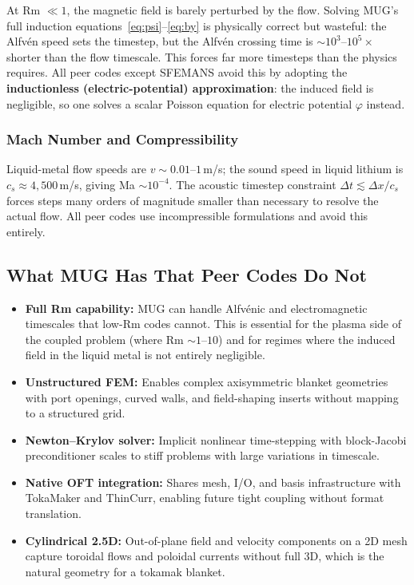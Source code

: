 \documentclass[11pt,letterpaper]{article}
\begin{document}
At Rm $\ll 1$, the magnetic field is barely perturbed by the flow.  Solving
MUG's full induction equations~\eqref{eq:psi}--\eqref{eq:by} is physically
correct but wasteful: the Alfv\'{e}n speed sets the timestep, but the
Alfv\'{e}n crossing time is $\sim 10^3$--$10^5\times$ shorter than the
flow timescale.  This forces far more timesteps than the physics requires.
All peer codes except SFEMANS avoid this by adopting the \textbf{inductionless
(electric-potential) approximation}: the induced field is negligible, so one
solves a scalar Poisson equation for electric potential $\varphi$ instead.

\subsubsection{Mach Number and Compressibility}

Liquid-metal flow speeds are $v \sim 0.01$--$1$\,m/s; the sound speed in
liquid lithium is $c_s \approx 4{,}500$\,m/s, giving Ma $\sim 10^{-4}$.  The
acoustic timestep constraint $\Delta t \lesssim \Delta x / c_s$ forces steps
many orders of magnitude smaller than necessary to resolve the actual flow.
All peer codes use incompressible formulations and avoid this entirely.

\subsection{What MUG Has That Peer Codes Do Not}

\begin{itemize}
  \item \textbf{Full Rm capability:} MUG can handle Alfv\'{e}nic and
    electromagnetic timescales that low-Rm codes cannot.  This is essential
    for the plasma side of the coupled problem (where Rm $\sim 1$--$10$) and
    for regimes where the induced field in the liquid metal is not entirely
    negligible.

  \item \textbf{Unstructured FEM:} Enables complex axisymmetric blanket
    geometries with port openings, curved walls, and field-shaping inserts
    without mapping to a structured grid.

  \item \textbf{Newton--Krylov solver:} Implicit nonlinear time-stepping with
    block-Jacobi preconditioner scales to stiff problems with large variations
    in timescale.

  \item \textbf{Native OFT integration:} Shares mesh, I/O, and basis
    infrastructure with TokaMaker and ThinCurr, enabling future tight coupling
    without format translation.

  \item \textbf{Cylindrical 2.5D:} Out-of-plane field and velocity components
    on a 2D mesh capture toroidal flows and poloidal currents without full 3D,
    which is the natural geometry for a tokamak blanket.
\end{itemize}
\end{document}
